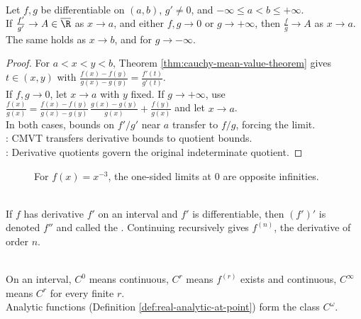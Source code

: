 \begin{theorem} \label{thm:lhospital-one-sided} \\
Let $f,g$ be differentiable on $(a,b)$, $g'\neq0$, and $-\infty\leq a<b\leq+\infty$.\\
If $\frac{f'}{g'}\to A\in\overline{\R}$ as $x\to a$, and either $f,g\to0$ or $g\to+\infty$, then $\frac{f}{g}\to A$ as $x\to a$.\\
The same holds as $x\to b$, and for $g\to-\infty$.
\begin{proof}
For $a<x<y<b$, Theorem \ref{thm:cauchy-mean-value-theorem} gives $t\in(x,y)$ with $\frac{f(x)-f(y)}{g(x)-g(y)}=\frac{f'(t)}{g'(t)}$.\\
If $f,g\to0$, let $x\to a$ with $y$ fixed. If $g\to+\infty$, use $\frac{f(x)}{g(x)} =\frac{f(x)-f(y)}{g(x)-g(y)}\,\frac{g(x)-g(y)}{g(x)}+\frac{f(y)}{g(x)}$ and let $x\to a$.\\
In both cases, bounds on $f'/g'$ near $a$ transfer to $f/g$, forcing the limit.\\
: CMVT transfers derivative bounds to quotient bounds.\\
: Derivative quotients govern the original indeterminate quotient.
\end{proof}
\end{theorem}

\begin{figure}[H]
  \centering
  
  \caption{For $f(x)=x^{-3}$, the one-sided limits at $0$ are opposite infinities.}
  \label{fig:reciprocal-cubic-one-sided-limits}
\end{figure}

\begin{definition} \label{def:higher-derivatives} \\
If $f$ has derivative $f'$ on an interval and $f'$ is differentiable, then $(f')'$ is denoted $f''$ and called the . Continuing recursively gives $f^{(n)}$, the derivative of order $n$.
\end{definition}

\begin{definition} \label{def:smoothness-classes-one-variable} \\
On an interval, $C^0$ means continuous, $C^r$ means $f^{(r)}$ exists and continuous, $C^\infty$ means $C^r$ for every finite $r$.\\
Analytic functions (Definition \ref{def:real-analytic-at-point}) form the class $C^\omega$.
\end{definition}

